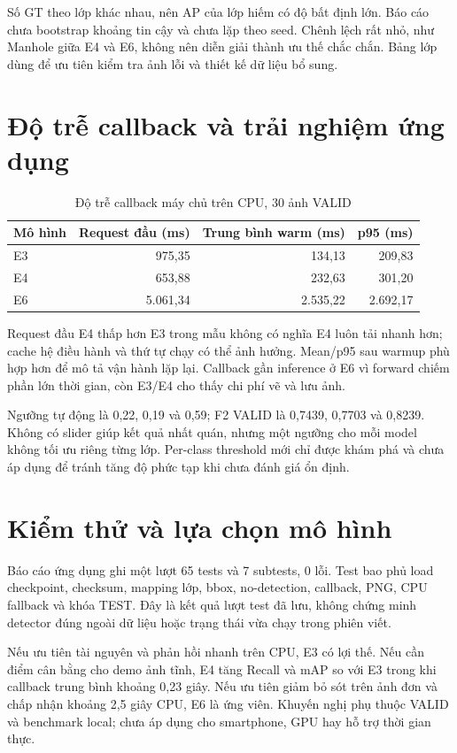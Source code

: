 Số GT theo lớp khác nhau, nên AP của lớp hiếm có độ bất định lớn. Báo cáo chưa bootstrap khoảng tin cậy và chưa lặp theo seed. Chênh lệch rất nhỏ, như Manhole giữa E4 và E6, không nên diễn giải thành ưu thế chắc chắn. Bảng lớp dùng để ưu tiên kiểm tra ảnh lỗi và thiết kế dữ liệu bổ sung.

\section{Độ trễ callback và trải nghiệm ứng dụng}
\begin{table}[H]\centering\small
\caption{Độ trễ callback máy chủ trên CPU, 30 ảnh VALID}\label{tab:server}
\begin{tabular}{lrrr}\toprule
Mô hình & Request đầu (ms) & Trung bình warm (ms) & p95 (ms)\\\midrule
E3 & 975,35 & 134,13 & 209,83\\
E4 & 653,88 & 232,63 & 301,20\\
E6 & 5.061,34 & 2.535,22 & 2.692,17\\\bottomrule
\end{tabular}
\end{table}

Request đầu E4 thấp hơn E3 trong mẫu không có nghĩa E4 luôn tải nhanh hơn; cache hệ điều hành và thứ tự chạy có thể ảnh hưởng. Mean/p95 sau warmup phù hợp hơn để mô tả vận hành lặp lại. Callback gần inference ở E6 vì forward chiếm phần lớn thời gian, còn E3/E4 cho thấy chi phí vẽ và lưu ảnh.

Ngưỡng tự động là 0,22, 0,19 và 0,59; F2 VALID là 0,7439, 0,7703 và 0,8239. Không có slider giúp kết quả nhất quán, nhưng một ngưỡng cho mỗi model không tối ưu riêng từng lớp. Per-class threshold mới chỉ được khám phá và chưa áp dụng để tránh tăng độ phức tạp khi chưa đánh giá ổn định.

\section{Kiểm thử và lựa chọn mô hình}
Báo cáo ứng dụng ghi một lượt 65 tests và 7 subtests, 0 lỗi. Test bao phủ load checkpoint, checksum, mapping lớp, bbox, no-detection, callback, PNG, CPU fallback và khóa TEST. Đây là kết quả lượt test đã lưu, không chứng minh detector đúng ngoài dữ liệu hoặc trạng thái vừa chạy trong phiên viết.

Nếu ưu tiên tài nguyên và phản hồi nhanh trên CPU, E3 có lợi thế. Nếu cần điểm cân bằng cho demo ảnh tĩnh, E4 tăng Recall và mAP so với E3 trong khi callback trung bình khoảng 0,23 giây. Nếu ưu tiên giảm bỏ sót trên ảnh đơn và chấp nhận khoảng 2,5 giây CPU, E6 là ứng viên. Khuyến nghị phụ thuộc VALID và benchmark local; chưa áp dụng cho smartphone, GPU hay hỗ trợ thời gian thực.
